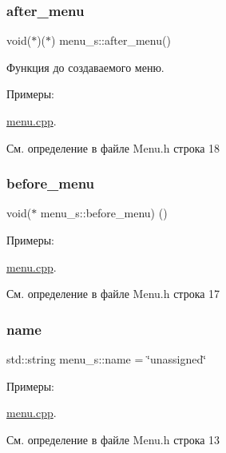 \subsubsection{\texorpdfstring{after\+\_\+menu}{after\_menu}}
{\footnotesize\ttfamily void($\ast$)($\ast$) menu\+\_\+s\+::after\+\_\+menu()}

Функция до создаваемого меню. \begin{Desc}
\item[Примеры\+: ]\par
\hyperlink{menu_8cpp-example}{menu.\+cpp}.\end{Desc}


См. определение в файле Menu.\+h строка 18

\mbox{\label{structmenu__s_a856a04d9c6a20c33b0a763149aa021fc}} 
\subsubsection{\texorpdfstring{before\+\_\+menu}{before\_menu}}
{\footnotesize\ttfamily void($\ast$ menu\+\_\+s\+::before\+\_\+menu) ()}

\begin{Desc}
\item[Примеры\+: ]\par
\hyperlink{menu_8cpp-example}{menu.\+cpp}.\end{Desc}


См. определение в файле Menu.\+h строка 17

\mbox{\label{structmenu__s_a2b4d6cd699b46daba2bb8297c11971aa}} 
\subsubsection{\texorpdfstring{name}{name}}
{\footnotesize\ttfamily std\+::string menu\+\_\+s\+::name = \char`\"{}unassigned\char`\"{}}

\begin{Desc}
\item[Примеры\+: ]\par
\hyperlink{menu_8cpp-example}{menu.\+cpp}.\end{Desc}


См. определение в файле Menu.\+h строка 13

